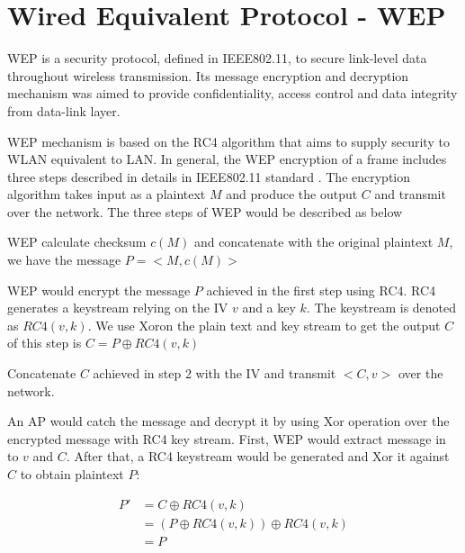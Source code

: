 \section{Wired Equivalent Protocol - WEP}


\ac{WEP} is a security protocol, defined in \ac{IEEE}802.11, to secure link-level data throughout wireless transmission. Its message encryption and decryption mechanism was aimed to provide confidentiality, access control and data integrity from data-link layer.

\ac{WEP} mechanism is based on the \ac{RC4} algorithm\cite{mousa2006evaluation} that aims to supply security to \ac{WLAN} equivalent to \ac{LAN}. In general, the \ac{WEP} encryption of a frame includes three steps described in details in \ac{IEEE}802.11 standard \cite{al2006ieee}. The encryption algorithm takes input as a plaintext $M$ and produce the output $C$ and transmit over the network. The three steps of \ac{WEP} would be described as below
\begin{steps}
	\item \ac{WEP} calculate checksum $c(M)$ and concatenate with the original plaintext $M$, we have the message $P = <M, c(M)>$
	\item \ac{WEP} would encrypt the message $P$ achieved in the first step using \ac{RC4}. \ac{RC4} generates a keystream relying on the \ac{IV} $v$ and a key $k$. The keystream is denoted as $RC4(v,k)$. We use \ac{Xor}on the plain text and key stream to get the output $C$ of this step is $C = P \oplus RC4(v,k)$
	\item Concatenate $C$ achieved in step 2 with the \ac{IV} and transmit $<C, v>$ over the network.
\end{steps}

An \ac{AP} would catch the message and decrypt it by using \ac{Xor} operation over the encrypted message with \ac{RC4} key stream.  First, \ac{WEP} would extract message in to $v$ and $C$. After that, a \ac{RC4} keystream would be generated and \ac{Xor} it against $C$ to obtain plaintext $P$:
\begin{center}
	\begin{align}
	P'&= C \oplus RC4(v, k) \\
	&= (P \oplus RC4(v, k)) \oplus RC4(v, k) \\
	&= P
	\end{align}
\end{center}

